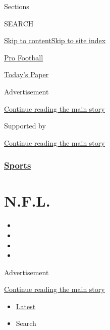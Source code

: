 Sections

SEARCH

\protect\hyperlink{site-content}{Skip to
content}\protect\hyperlink{site-index}{Skip to site index}

\href{https://www.nytimes3xbfgragh.onion/section/sports/football}{Pro
Football}

\href{https://myaccount.nytimes3xbfgragh.onion/auth/login?response_type=cookie\&client_id=vi}{}

\href{https://www.nytimes3xbfgragh.onion/section/todayspaper}{Today's
Paper}

Advertisement

\protect\hyperlink{after-top}{Continue reading the main story}

Supported by

\protect\hyperlink{after-sponsor}{Continue reading the main story}

\hypertarget{sports}{%
\subsubsection{\texorpdfstring{\href{/section/sports}{Sports}}{Sports}}\label{sports}}

\hypertarget{nfl}{%
\section{N.F.L.}\label{nfl}}

\begin{itemize}
\item
\item
\item
\item
\end{itemize}

Advertisement

\protect\hyperlink{after-subheader}{Continue reading the main story}

\begin{itemize}
\tightlist
\item
  \protect\hyperlink{stream-panel}{Latest}
\item
  Search
\end{itemize}

